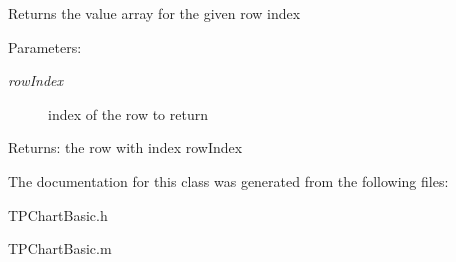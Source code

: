 Returns the value array for the given row index \begin{Desc}
\item[Parameters:]
\begin{description}
\item[{\em rowIndex}]index of the row to return \end{description}
\end{Desc}
\begin{Desc}
\item[Returns:]the row with index rowIndex \end{Desc}


The documentation for this class was generated from the following files:\begin{CompactItemize}
\item 
TPChartBasic.h\item 
TPChartBasic.m\end{CompactItemize}
